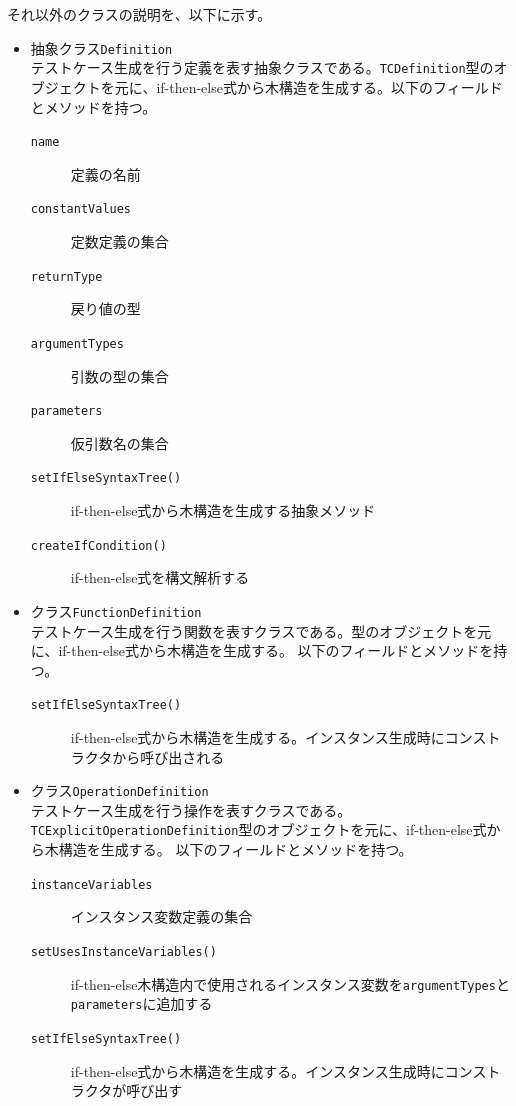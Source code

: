 \documentclass[uplatex, report, a4j, 10pt]{jsbook}
\newcommand\ttt[1]{\texttt{#1}}
\begin{document}
それ以外のクラスの説明を、以下に示す。

\begin{itemize}
  \item 抽象クラス\ttt{Definition}\\
        テストケース生成を行う定義を表す抽象クラスである。\ttt{TCDefinition}型のオブジェクトを元に、if-then-else式から木構造を生成\cite{tachiyama6}する。以下のフィールドとメソッドを持つ。
        \begin{description}
          \item[\ttt{name}] 定義の名前
          \item[\ttt{constantValues}] 定数定義の集合
          \item[\ttt{returnType}] 戻り値の型
          \item[\ttt{argumentTypes}] 引数の型の集合
          \item[\ttt{parameters}] 仮引数名の集合
          \item[\ttt{setIfElseSyntaxTree()}] if-then-else式から木構造を生成する抽象メソッド
          \item[\ttt{createIfCondition()}] if-then-else式を構文解析する
        \end{description}

  \item クラス\ttt{FunctionDefinition}\\
        テストケース生成を行う関数を表すクラスである。\TCExplicitFunctionDefinition{}型のオブジェクトを元に、if-then-else式から木構造を生成する。
        以下のフィールドとメソッドを持つ。
        \begin{description}
          \item[\ttt{setIfElseSyntaxTree()}] if-then-else式から木構造を生成する。インスタンス生成時にコンストラクタから呼び出される
        \end{description}

  \item クラス\ttt{OperationDefinition}\\
        テストケース生成を行う操作を表すクラスである。\ttt{TCExplicitOperationDefinition}型のオブジェクトを元に、if-then-else式から木構造を生成する。
        以下のフィールドとメソッドを持つ。
        \begin{description}
          \item[\ttt{\ttt{instanceVariables}}] インスタンス変数定義の集合
          \item[\ttt{setUsesInstanceVariables()}] if-then-else木構造内で使用されるインスタンス変数を\ttt{argumentTypes}と\ttt{parameters}に追加する
          \item[\ttt{setIfElseSyntaxTree()}] if-then-else式から木構造を生成する。インスタンス生成時にコンストラクタが呼び出す
        \end{description}


\end{itemize}
\end{document}
